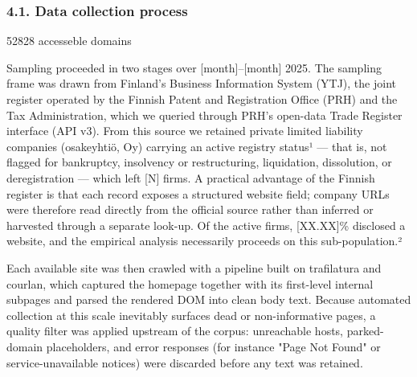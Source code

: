 \documentclass[runningheads]{llncs}
\begin{document}
\subsubsection{4.1. Data collection process}


52828 accesseble domains


Sampling proceeded in two stages over [month]–[month] 2025. The sampling frame was drawn from Finland's Business Information System (YTJ), the joint register operated by the Finnish Patent and Registration Office (PRH) and the Tax Administration, which we queried through PRH's open-data Trade Register interface (API v3). From this source we retained private limited liability companies (osakeyhtiö, Oy) carrying an active registry status¹ — that is, not flagged for bankruptcy, insolvency or restructuring, liquidation, dissolution, or deregistration — which left [N] firms. A practical advantage of the Finnish register is that each record exposes a structured website field; company URLs were therefore read directly from the official source rather than inferred or harvested through a separate look-up. Of the active firms, [XX.XX]\% disclosed a website, and the empirical analysis necessarily proceeds on this sub-population.²

Each available site was then crawled with a pipeline built on trafilatura and courlan, which captured the homepage together with its first-level internal subpages and parsed the rendered DOM into clean body text. Because automated collection at this scale inevitably surfaces dead or non-informative pages, a quality filter was applied upstream of the corpus: unreachable hosts, parked-domain placeholders, and error responses (for instance "Page Not Found" or service-unavailable notices) were discarded before any text was retained.
\end{document}
